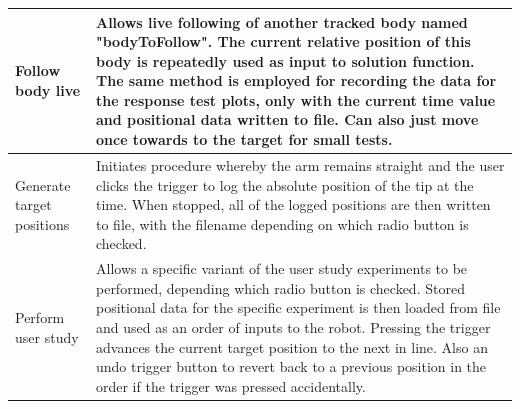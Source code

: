 \documentclass[11pt]{article}
\begin{document}
\begin{center}
\begin{tabularx}{0.95\textwidth}{|p{10em}|X|}
\\
\hline
Follow body live & Allows live following of another tracked body named "bodyToFollow". The current relative position of this body is repeatedly used as input to solution function. The same method is employed for recording the data for the response test plots, only with the current time value and positional data written to file. Can also just move once towards to the target for small tests.
\\
\hline
Generate target \newline positions & Initiates procedure whereby the arm remains straight and the user clicks the trigger to log the absolute position of the tip at the time. When stopped, all of the logged positions are then written to file, with the filename depending on which radio button is checked.
\\
\hline
Perform user study & Allows a specific variant of the user study experiments to be performed, depending which radio button is checked. Stored positional data for the specific experiment is then loaded from file and used as an order of inputs to the robot. Pressing the trigger advances the current target position to the next in line. Also an undo trigger button to revert back to a previous position in the order if the trigger was pressed accidentally.
\\
\hline
\end{tabularx}
\end{center}




\pagebreak
\end{document}
